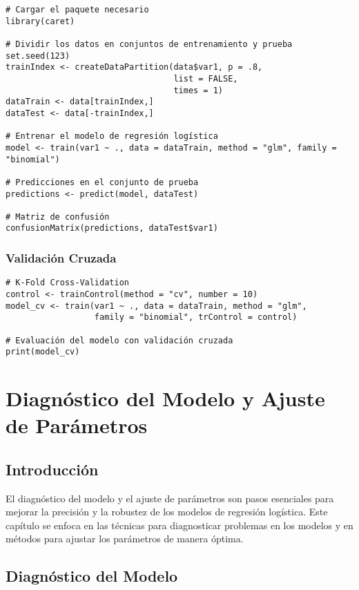 \documentclass[a4paper]{report} %
\begin{document}
\begin{verbatim}
# Cargar el paquete necesario
library(caret)

# Dividir los datos en conjuntos de entrenamiento y prueba
set.seed(123)
trainIndex <- createDataPartition(data$var1, p = .8, 
                                  list = FALSE, 
                                  times = 1)
dataTrain <- data[trainIndex,]
dataTest <- data[-trainIndex,]

# Entrenar el modelo de regresión logística
model <- train(var1 ~ ., data = dataTrain, method = "glm", family = "binomial")

# Predicciones en el conjunto de prueba
predictions <- predict(model, dataTest)

# Matriz de confusión
confusionMatrix(predictions, dataTest$var1)
\end{verbatim}

\subsection{Validación Cruzada}

\begin{verbatim}
# K-Fold Cross-Validation
control <- trainControl(method = "cv", number = 10)
model_cv <- train(var1 ~ ., data = dataTrain, method = "glm", 
                  family = "binomial", trControl = control)

# Evaluación del modelo con validación cruzada
print(model_cv)
\end{verbatim}



\chapter{Diagnóstico del Modelo y Ajuste de Parámetros}


\section{Introducci\'on}

El diagn\'ostico del modelo y el ajuste de par\'ametros son pasos esenciales para mejorar la precisi\'on y la robustez de los modelos de regresi\'on log\'istica. Este cap\'itulo se enfoca en las t\'ecnicas para diagnosticar problemas en los modelos y en m\'etodos para ajustar los par\'ametros de manera \'optima.

\section{Diagn\'ostico del Modelo}
\end{document}
